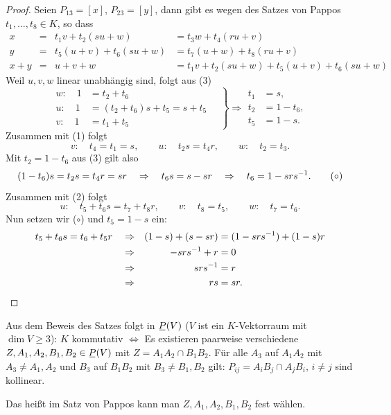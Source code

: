 \begin{proof}
 Seien $P_{13} = [x]$, $P_{23} = [y]$, dann gibt es wegen des Satzes von Pappos $t_1, \ldots, t_8 \in K$, so dass
 \begin{align*}
    x &=   &   t_1 v + t_2 (su+w) &= t_3 w + t_4 (ru+v) \tag{1} \\
    y &=   &   t_5 (u+v) + t_6 (su+w) &= t_7 (u+w) + t_8 (ru+v) \tag{2} \\
  x+y &=   &   u+v+w &= t_1 v + t_2 (su+w) + t_5 (u+v) + t_6 (su+w) \tag{3}
 \end{align*}
 Weil $u,v,w$ linear unabhängig sind, folgt aus (3)
 \[ \left. \begin{aligned}
    w: \quad 1 &= t_2 + t_6 \\
    u: \quad 1 &= (t_2+t_6) s + t_5 = s + t_5 \\
    v: \quad 1 &= t_1 + t_5
    \end{aligned}
    \quad \right\} \Rightarrow 
    \begin{aligned}
     t_1 &= s, \\
     t_2 &= 1 - t_6, \\
     t_5 &= 1 - s. 
    \end{aligned} \]
 Zusammen mit (1) folgt
 \[ v: \quad t_4 = t_1 = s, \qquad u: \quad t_2 s = t_4 r, \qquad w: \quad t_2 = t_3. \]
 Mit $t_2 = 1 - t_6$ aus (3) gilt also
 \[ (1-t_6)s = t_2 s = t_4 r = sr \quad \Rightarrow \quad t_6 s = s - sr \quad \Rightarrow \quad t_6 = 1 - srs^{-1}. \tag{$\circ$} \]
 Zusammen mit (2) folgt
 \[ u: \quad t_5 + t_6s = t_7 + t_8 r, \qquad v: \quad t_8 = t_5, \qquad w: \quad t_7 = t_6. \]
 Nun setzen wir ($\circ$) und $t_5 = 1-s$ ein:
 \begin{align*}
     t_5 + t_6 s = t_6 + t_5 r \quad
     &\Rightarrow & (1-s) + (s-sr) &= (1 - srs^{-1}) + (1-s)r \\
     &\Rightarrow & -srs^{-1} + r &= 0 \\
     &\Rightarrow & srs^{-1} &= r \\
     &\Rightarrow & rs &= sr. \qedhere 
 \end{align*}
\end{proof}

\begin{bem}
 Aus dem Beweis des Satzes folgt in $\proj(V)$ ($V$ ist ein $K$-Vektorraum mit $\dim V \ge 3$): $K$ kommutativ $\Leftrightarrow$ Es existieren paarweise verschiedene $Z, A_1, A_2, B_1, B_2 \in \proj(V)$ mit $Z = A_1 A_2 \cap B_1 B_2$. Für alle $A_3$ auf $A_1 A_2$ mit $A_3 \ne A_1, A_2$ und $B_3$ auf $B_1 B_2$ mit $B_3 \ne B_1, B_2$ gilt: $P_{ij} = A_i B_j \cap A_j B_i$, $i \ne j$ sind kollinear.
 
 Das heißt im Satz von Pappos kann man $Z, A_1, A_2, B_1, B_2$ fest wählen.
\end{bem}

